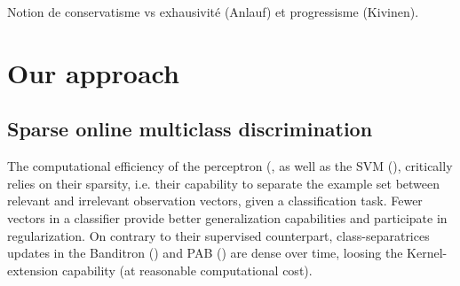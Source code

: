 \documentclass[preprint,12pt,authoryear]{elsarticle}
\begin{document}
{\color{green} Notion de conservatisme vs exhausivité (Anlauf) et progressisme (Kivinen).}












\section{Our approach}

\subsection{Sparse online multiclass discrimination}

%



The computational efficiency of the perceptron (\cite{rosenblatt1958perceptron}, as well as the SVM (\cite{vapnik1998statistical}),  critically relies on their sparsity, i.e. their capability to separate the example  set between relevant and irrelevant observation vectors, given a classification task. Fewer vectors in a classifier provide better generalization capabilities and participate in regularization.
On contrary to their supervised counterpart, class-separatrices updates in the Banditron (\cite{kakade2008efficient}) and PAB (\cite{zhong2015esann}) are dense over time, loosing the Kernel-extension capability (at reasonable computational cost). 
\end{document}
